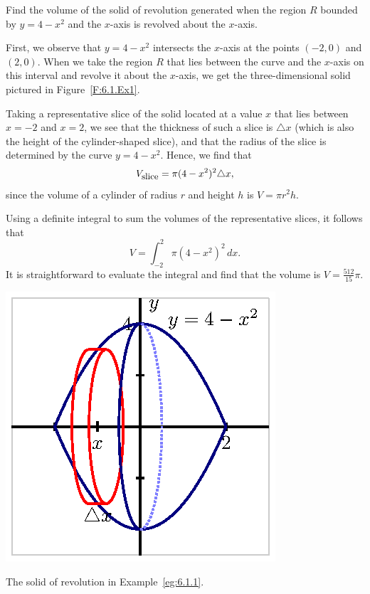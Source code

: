 \begin{example} \label{eg:6.1.1} %
Find the volume of the solid of revolution generated when the region $R$ bounded by $y = 4-x^2$ and the $x$-axis is revolved about the $x$-axis.

\solution
First, we observe that $y = 4-x^2$ intersects the $x$-axis at the points $(-2,0)$ and $(2,0)$.  When we take the region $R$  that lies between the curve and the $x$-axis on this interval and revolve it about the $x$-axis, we get the three-dimensional solid pictured in Figure~\ref{F:6.1.Ex1}.

Taking a representative slice of the solid located at a value $x$ that lies between $x = -2$ and $x = 2$, we see that the thickness of such a slice is $\triangle x$ (which is also the height of the cylinder-shaped slice), and that the radius of the slice is determined by the curve $y = 4-x^2$.  Hence, we find that 
$$V_{\text{\small{slice}}} = \pi (4-x^2)^2 \triangle x,$$
since the volume of a cylinder of radius $r$ and height $h$ is $V = \pi r^2 h$.

Using a definite integral to sum the volumes of the representative slices, it follows that 
$$V = \int_{-2}^{2} \pi (4-x^2)^2 \, dx.$$
It is straightforward to evaluate the integral and find that the volume is $V = \frac{512}{15}\pi$.	
\end{example}

\begin{marginfigure}[-8cm] %
\includegraphics{figures/6_2_Ex1.eps}
\caption{The solid of revolution in Example~\ref{eg:6.1.1}.} \label{F:6.1.Ex1}
\end{marginfigure}

